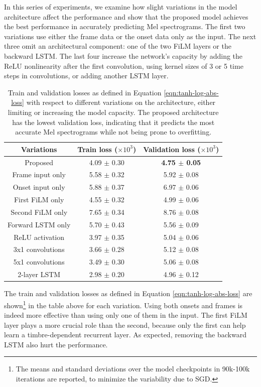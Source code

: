 In this series of experiments, we examine how slight variations in the model architecture affect the performance and show that the proposed model achieves the best performance in accurately predicting Mel spectrograms.
The first two variations use either the frame data or the onset data only as the input.
The next three omit an architectural component: one of the two FiLM layers or the backward LSTM.
The last four increase the network's capacity by adding the ReLU nonlinearity after the first convolution, using kernel sizes of 3 or 5 time steps in convolutions, or adding another LSTM layer.
\begin{table}
	\centering
	\renewcommand\arraystretch{1.2}
	\setlength\tabcolsep{0.3em}
	\begin{tabular}{c|c|c}
		Variations & Train loss ($\times 10^3$) & Validation loss ($\times 10^3$)\\
		\hline
		Proposed & 4.09 $\pm$ 0.30 & \textbf{4.75 $\pm$ 0.05} \\
		\hline
		Frame input only & 5.58 $\pm$ 0.32 & 5.92 $\pm$ 0.08 \\
		Onset input only & 5.88 $\pm$ 0.37 &  6.97 $\pm$ 0.06 \\
		\hline
		First FiLM only & 4.55 $\pm$ 0.32 & 4.99 $\pm$ 0.06 \\
		Second FiLM only & 7.65 $\pm$ 0.34 & 8.76 $\pm$ 0.08 \\
		Forward LSTM only & 5.70 $\pm$ 0.43 & 5.56 $\pm$ 0.09 \\
		\hline
		ReLU activation & 3.97 $\pm$ 0.35 & 5.04 $\pm$ 0.06 \\
		3x1 convolutions & 3.66 $\pm$ 0.28 & 5.12 $\pm$ 0.08 \\
		5x1 convolutions & 3.49 $\pm$ 0.30 & 5.06 $\pm$ 0.08 \\
		2-layer LSTM & 2.98 $\pm$ 0.20 & 4.96 $\pm$ 0.12 \\
	\end{tabular}
	\vspace{1em}
	\caption{Train and validation losses as defined in Equation \ref{eqn:tanh-log-abs-loss} with respect to different variations on the architecture, either limiting or increasing the model capacity. The proposed architecture has the lowest validation loss, indicating that it predicts the most accurate Mel spectrograms while not being prone to overfitting.}\label{tab:synthesis-ablation}
\end{table}
The train and validation losses as defined in Equation \ref{eqn:tanh-log-abs-loss} are shown\footnote{The means and standard deviations over the model checkpoints in 90k-100k iterations are reported, to minimize the variability due to SGD.} in the table above for each variation.
Using both onsets and frames is indeed more effective than using only one of them in the input.
The first FiLM layer plays a more crucial role than the second, because only the first can help learn a timbre-dependent recurrent layer.
As expected, removing the backward LSTM also hurt the performance.

